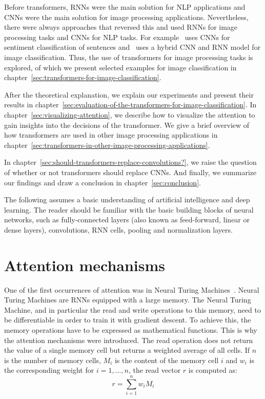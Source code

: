 \documentclass[a4paper]{scrartcl}
\let\stdsection\section
\renewcommand\section{\newpage\stdsection}
\begin{document}
    Before transformers, RNNs were the main solution for NLP applications and CNNs were the main solution for image processing applications.
    Nevertheless, there were always approaches that reversed this and used RNNs for image processing tasks and CNNs for NLP tasks.
    For example~\cite{kim2014convolutional} uses CNNs for sentiment classification of sentences and~\cite{yin2019cnnandrnn} uses a hybrid CNN and RNN model for image classification.
    Thus, the use of transformers for image processing tasks is explored, of which we present selected examples for image classification in chapter~\ref{sec:transformers-for-image-classification}.

    After the theoretical explanation, we explain our experiments and present their results in chapter~\ref{sec:evaluation-of-the-transformers-for-image-classification}.
    In chapter~\ref{sec:visualizing-attention}, we describe how to visualize the attention to gain insights into the decisions of the transformer.
    We give a brief overview of how transformers are used in other image processing applications in chapter~\ref{sec:transformers-in-other-image-processing-applications}.

    In chapter~\ref{sec:should-transformers-replace-convolutions?}, we raise the question of whether or not transformers should replace CNNs.
    And finally, we summarize our findings and draw a conclusion in chapter~\ref{sec:conclusion}.

    \bigskip
    The following assumes a basic understanding of artificial intelligence and deep learning.
    The reader should be familiar with the basic building blocks of neural networks, such as fully-connected layers (also known as feed-forward, linear or dense layers), convolutions, RNN cells, pooling and normalization layers.




    \section{Attention mechanisms}\label{sec:attention-mechanisms}
    One of the first occurrences of attention was in Neural Turing Machines~\cite{graves2014neural}.
    Neural Turing Machines are RNNs equipped with a large memory.
    The Neural Turing Machine, and in particular the read and write operations to this memory, need to be differentiable in order to train it with gradient descent.
    To achieve this, the memory operations have to be expressed as mathematical functions.
    This is why the attention mechanisms were introduced.
    The read operation does not return the value of a single memory cell but returns a weighted average of all cells.
    If $n$ is the number of memory cells, $M_i$ is the content of the memory cell $i$ and $w_i$ is the corresponding weight for $i=1, \dots, n$, the read vector $r$ is computed as:
    \begin{equation}
        r = \sum_{i=1}^n w_i M_i
    \end{equation}
\end{document}
